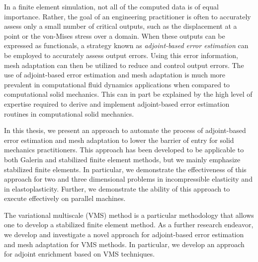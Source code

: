 
In a finite element simulation, not all of the computed
data is of equal importance. Rather, the goal of an engineering
practitioner is often to accurately assess only a small
number of critical outputs, such as the displacement
at a point or the von-Mises stress over a domain. When
these outputs can be expressed as functionals,
a strategy known as \emph{adjoint-based error estimation}
can be employed to accurately assess output errors.
Using this error information, mesh adaptation can then
be utilized to reduce and control output errors.
The use of adjoint-based error estimation and mesh adaptation
is much more prevalent in computational fluid dynamics
applications when compared to computational solid mechanics.
This can in part be explained by the high level of expertise
required to derive and implement adjoint-based error estimation
routines in computational solid mechanics.

In this thesis, we present an approach to automate
the process of adjoint-based error estimation and mesh
adaptation to lower the barrier of entry for solid
mechanics practitioners. This approach has been developed
to be applicable to both Galerin and stabilized finite
element methods, but we mainly emphasize stabilized finite
elements. In particular, we demonstrate the
effectiveness of this approach for two and three
dimensional problems in incompressible elasticity and
in elastoplasticity. Further, we demonstrate the ability
of this approach to execute effectively on parallel
machines.

The variational multiscale (VMS) method is a particular
methodology that allows one to develop a stabilized
finite element method. As a further research endeavor,
we develop and investigate a novel approach for
adjoint-based error estimation and mesh adaptation
for VMS methods. In particular, we develop an approach
for adjoint enrichment based on VMS techniques.
